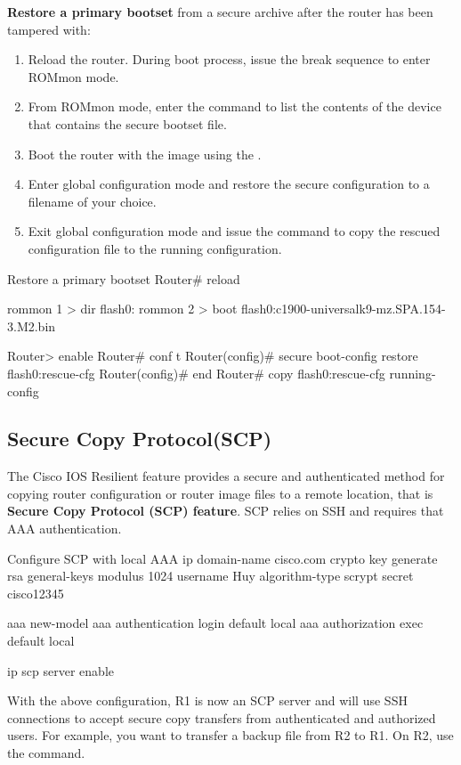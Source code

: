 \textbf{Restore a primary bootset} from a secure archive after the router has been tampered with:

\begin{enumerate}
\item Reload the router. During boot process, issue the break sequence to enter ROMmon mode.
\item From ROMmon mode, enter the  command to list the contents of the device that contains the secure bootset file.
\item Boot the router with the image using the .
\item Enter global configuration mode and restore the secure configuration to a filename of your choice.
\item Exit global configuration mode and issue the  command to copy the rescued configuration file to the running configuration.
\end{enumerate}

\begin{sexylisting}{Restore a primary bootset}
Router# reload

rommon 1 > dir flash0:
rommon 2 > boot flash0:c1900-universalk9-mz.SPA.154-3.M2.bin

Router> enable
Router# conf t
Router(config)# secure boot-config restore flash0:rescue-cfg
Router(config)# end
Router# copy flash0:rescue-cfg running-config
\end{sexylisting}

\subsection{Secure Copy Protocol(SCP)}

The Cisco IOS Resilient feature provides a secure and authenticated method for copying router configuration or router image files to a remote location, that is \textbf{Secure Copy Protocol (SCP) feature}. SCP relies on SSH and requires that AAA authentication. 

\begin{sexylisting}{Configure SCP with local AAA}
ip domain-name cisco.com
crypto key generate rsa general-keys modulus 1024
username Huy algorithm-type scrypt secret cisco12345

aaa new-model 
aaa authentication login default local 
aaa authorization exec default local

ip scp server enable
\end{sexylisting}

With the above configuration, R1 is now an SCP server and will use SSH connections to accept secure copy transfers from authenticated and authorized users. For example, you want to transfer a backup file from R2 to R1. On R2, use the  command.

